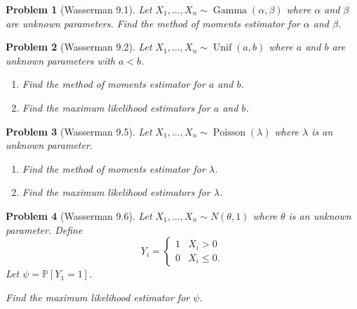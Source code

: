 \documentclass{article}
\newtheorem{problem}{Problem}
\newcommand{\PP}{\mathbb{P}}
\begin{document}
\begin{problem}[Wasserman 9.1]
    Let $X_1, \ldots, X_n \sim \operatorname{Gamma}(\alpha,\beta)$ where $\alpha$ and $\beta$ are unknown parameters.
    Find the method of moments estimator for $\alpha$ and $\beta$.
\end{problem}


\begin{problem}[Wasserman 9.2]
    Let $X_1, \ldots, X_n \sim \operatorname{Unif}(a,b)$ where $a$ and $b$ are unknown parameters with $a<b$.

    \begin{enumerate}[label=(\alph*),topsep=0pt]
        \item Find the method of moments estimator for $a$ and $b$.
        \item Find the maximum likelihood estimators for $a$ and $b$.
    \end{enumerate}
\end{problem}


\begin{problem}[Wasserman 9.5]
    Let $X_1, \ldots, X_n \sim \operatorname{Poisson}(\lambda)$ where $\lambda$ is an unknown parameter.

    \begin{enumerate}[label=(\alph*),topsep=0pt]
        \item Find the method of moments estimator for $\lambda$.
        \item Find the maximum likelihood estimators for $\lambda$.
    \end{enumerate}
\end{problem}


\begin{problem}[Wasserman 9.6]
    Let $X_1, \ldots, X_n \sim N(\theta,1)$ where $\theta$ is an unknown parameter.
    Define
    \begin{equation*}
        Y_i = \begin{cases}1 & X_i > 0 \\ 0 & X_i \leq 0. \end{cases}
    \end{equation*}
    Let $\psi = \PP[Y_1 = 1]$.

    Find the maximum likelihood estimator for $\psi$.
\end{problem}
\end{document}
